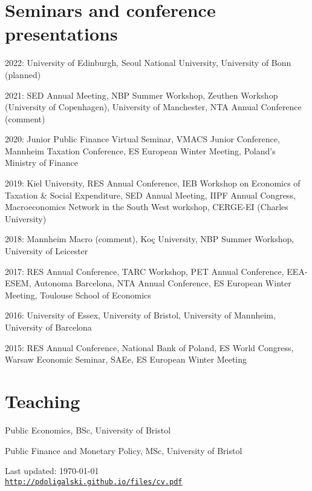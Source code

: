 \documentclass[letterpaper]{article}
\def\footerlink{http://pdoligalski.github.io/files/cv.pdf}
\renewenvironment{itemize}{
  \begin{list}{}{
    \setlength{\leftmargin}{1.5em}
  }
}{
  \end{list}
}
\begin{document}
\section*{Seminars and conference presentations}
\begin{itemize}
  \item 2022: University of Edinburgh, Seoul National University, University of Bonn (planned)
  \item 2021: SED Annual Meeting, NBP Summer Workshop, Zeuthen Workshop (University of Copenhagen), University of Manchester, NTA Annual Conference (comment) 
  \item 2020: Junior Public Finance Virtual Seminar, VMACS Junior Conference, Mannheim Taxation Conference, ES European Winter Meeting, Poland's Ministry of Finance
  \item 2019: Kiel University, RES Annual Conference, IEB Workshop on Economics of Taxation \& Social Expenditure, SED Annual Meeting, IIPF Annual Congress, Macroeconomics Network in the South West workshop, CERGE-EI (Charles University)
  \item 2018: Mannheim Macro (comment), Ko\c{c} University, NBP Summer Workshop, University of Leicester
  \item 2017: RES Annual Conference, TARC Workshop, PET Annual Conference, EEA-ESEM, Autonoma Barcelona, NTA Annual Conference, ES European Winter Meeting, Toulouse School of Economics
  \item 2016: University of Essex, University of Bristol, University of Mannheim, University of Barcelona
  \item 2015: RES Annual Conference, National Bank of Poland, ES World Congress, Warsaw Economic Seminar, SAEe, ES European Winter Meeting
\end{itemize}

\section*{Teaching}
\begin{itemize}
  \item Public Economics, BSc, University of Bristol
  \item Public Finance and Monetary Policy, MSc, University of Bristol
\end{itemize}

\bigskip

\begin{center}
  \begin{footnotesize}
    Last updated: \today \\
    \href{\footerlink}{\texttt{\footerlink}}
  \end{footnotesize}
\end{center}
\end{document}
